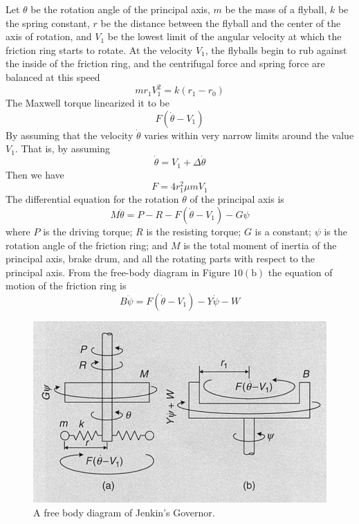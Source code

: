 \documentclass[11pt]{scrartcl} %
\begin{document}
Let $\theta$ be the rotation angle of the principal axis, $m$ be the mass of a flyball, $k$ be the spring constant, $r$ be the distance between the flyball and the center of the axis of rotation, and $V_{1}$ be the lowest limit of the angular velocity at which the friction ring starts to rotate. At the velocity $V_{1}$, the flyballs begin to rub against the inside of the friction ring, and the centrifugal force and spring force are balanced at this speed
\begin{equation}m r_{1} V_{1}^{2}=k\left(r_{1}-r_{0}\right)\end{equation}
The Maxwell torque linearized it to be
\begin{equation}F\left(\dot{\theta}-V_{1}\right)\end{equation}
By assuming that the velocity $\dot{\theta}$ varies within very narrow limits around the value $V_{1} .$ That is, by assuming
\begin{equation}\dot{\theta} = V_{1}+\Delta\dot{\theta}\end{equation}
Then we have
\begin{equation}F=4 r_{1}^{2} \mu m V_{1}\end{equation}
The differential equation for the rotation $\theta$ of the principal axis is
\begin{equation}M \ddot{\theta}=P-R-F\left(\dot{\theta}-V_{1}\right)-G \psi\end{equation}
where $P$ is the driving torque; $R$ is the resisting torque; $G$ is a constant; $\psi$ is the rotation angle of the friction ring; and $M$ is the total moment of inertia of the principal axis, brake drum, and all the rotating parts with respect to the principal axis. From the free-body diagram in Figure $10(\mathrm{b})$ the equation of motion of the friction ring is
\begin{equation}B \ddot{\psi}=F\left(\dot{\theta}-V_{1}\right)-Y \dot{\psi}-W\end{equation}

\begin{figure}[h]
	\centering
	\includegraphics[width=0.5\columnwidth]{images/p2.JPG}
	\caption{A free body diagram of Jenkin's Governor.}
\end{figure}
\end{document}
